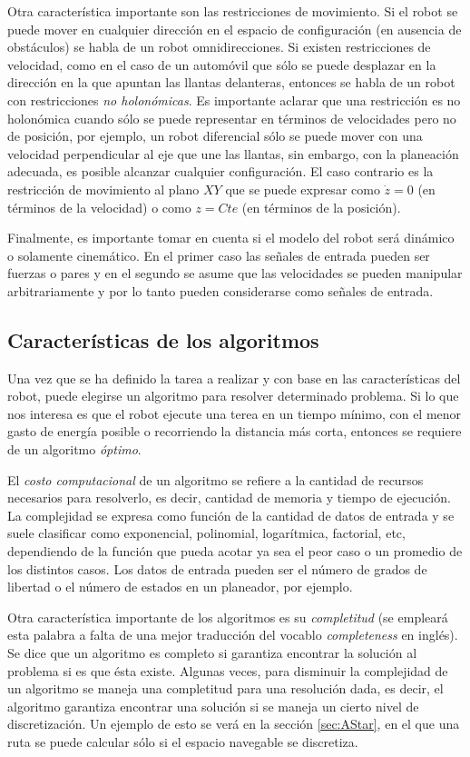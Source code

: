 \documentclass[letterpaper,12pt]{article}
\begin{document}
Otra característica importante son las restricciones de movimiento. Si el robot se puede mover en cualquier dirección en el espacio de configuración (en ausencia de obstáculos) se habla de un robot omnidirecciones. Si existen restricciones de velocidad, como en el caso de un automóvil que sólo se puede desplazar en la dirección en la que apuntan las llantas delanteras, entonces se habla de un robot con restricciones \textit{no holonómicas}. Es importante aclarar que una restricción es no holonómica cuando sólo se puede representar en términos de velocidades pero no de posición, por ejemplo, un robot diferencial sólo se puede mover con una velocidad perpendicular al eje que une las llantas, sin embargo, con la planeación adecuada, es posible alcanzar cualquier configuración. El caso contrario es la restricción de movimiento al plano $XY$ que se puede expresar como $\dot{z}=0$ (en términos de la velocidad) o como $z=Cte$ (en términos de la posición).

Finalmente, es importante tomar en cuenta si el modelo del robot será dinámico o solamente cinemático. En el primer caso las señales de entrada pueden ser fuerzas o pares y en el segundo se asume que las velocidades se pueden manipular arbitrariamente y por lo tanto pueden considerarse como señales de entrada. 

\subsection{Características de los algoritmos}

Una vez que se ha definido la tarea a realizar y con base en las características del robot, puede elegirse un algoritmo para resolver determinado problema. Si lo que nos interesa es que el robot ejecute una terea en un tiempo mínimo, con el menor gasto de energía posible o recorriendo la distancia más corta, entonces se requiere de un algoritmo \textit{óptimo}. 

El \textit{costo computacional} de un algoritmo se refiere a la cantidad de recursos necesarios para resolverlo, es decir, cantidad de memoria y tiempo de ejecución. La complejidad se expresa como función de la cantidad de datos de entrada y se suele clasificar como exponencial, polinomial, logarítmica, factorial, etc, dependiendo de la función que pueda acotar ya sea el peor caso o un promedio de los distintos casos. Los datos de entrada pueden ser el número de grados de libertad o el número de estados en un planeador, por ejemplo. 

Otra característica importante de los algoritmos es su \textit{completitud} (se empleará esta palabra a falta de una mejor traducción del vocablo \textit{completeness} en inglés). Se dice que un algoritmo es completo si garantiza encontrar la solución al problema si es que ésta existe. Algunas veces, para disminuir la complejidad de un algoritmo se maneja una completitud para una resolución dada, es decir, el algoritmo garantiza encontrar una solución si se maneja un cierto nivel de discretización. Un ejemplo de esto se verá en la sección \ref{sec:AStar}, en el que una ruta se puede calcular sólo si el espacio navegable se discretiza. 
\end{document}
